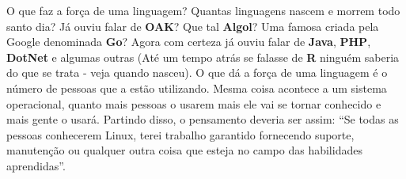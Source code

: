 O que faz a força de uma linguagem? Quantas linguagens nascem e morrem todo santo dia? Já ouviu falar de \textbf{OAK}? Que tal \textbf{Algol}? Uma famosa criada pela Google denominada \textbf{Go}? Agora com certeza já ouviu falar de \textbf{Java}, \textbf{PHP}, \textbf{DotNet} e algumas outras (Até um tempo atrás se falasse de \textbf{R} ninguém saberia do que se trata - veja quando nasceu). O que dá a força de uma linguagem é o número de pessoas que a estão utilizando. Mesma coisa acontece a um sistema operacional, quanto mais pessoas o usarem mais ele vai se tornar conhecido e mais gente o usará. Partindo disso, o pensamento deveria ser assim: ``Se todas as pessoas conhecerem Linux, terei trabalho garantido fornecendo suporte, manutenção ou qualquer outra coisa que esteja no campo das habilidades aprendidas''. 

